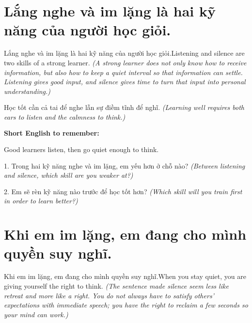 \section{Lắng nghe và im lặng là hai kỹ năng của người học giỏi.}
\begin{truyen}{Lắng nghe và im lặng là hai kỹ năng của người học giỏi.}{Listening and silence are two skills of a strong learner.}
\textit{(A strong learner does not only know how to receive information, but also how to keep a quiet interval so that information can settle. Listening gives good input, and silence gives time to turn that input into personal understanding.)}
\end{truyen}

\begin{baihoc}
Học tốt cần cả tai để nghe lẫn sự điềm tĩnh để nghĩ.
\textit{(Learning well requires both ears to listen and the calmness to think.)}
\end{baihoc}

\begin{ghinhoanh}
\textbf{Short English to remember:}

Good learners listen, then go quiet enough to think.

\end{ghinhoanh}

\begin{tuhocnhanh}
1. Trong hai kỹ năng nghe và im lặng, em yếu hơn ở chỗ nào? \textit{(Between listening and silence, which skill are you weaker at?)}

2. Em sẽ rèn kỹ năng nào trước để học tốt hơn? \textit{(Which skill will you train first in order to learn better?)}
\end{tuhocnhanh}
\ngancach


\section{Khi em im lặng, em đang cho mình quyền suy nghĩ.}
\begin{truyen}{Khi em im lặng, em đang cho mình quyền suy nghĩ.}{When you stay quiet, you are giving yourself the right to think.}
\textit{(The sentence made silence seem less like retreat and more like a right. You do not always have to satisfy others' expectations with immediate speech; you have the right to reclaim a few seconds so your mind can work.)}
\end{truyen}

